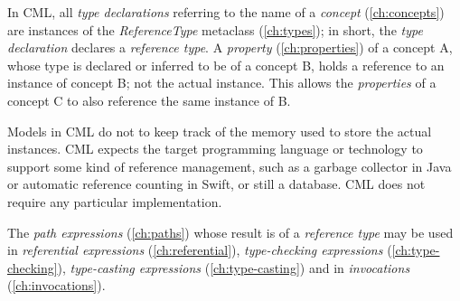 In CML, all \emph{type declarations}
referring to the name of a \emph{concept} (\ref{ch:concepts})
are instances of the \emph{ReferenceType} metaclass (\ref{ch:types});
in short, the \emph{type declaration} declares a \emph{reference type}.
A \emph{property} (\ref{ch:properties}) of a concept A,
whose type is declared or inferred to be of a concept B,
holds a reference to an instance of concept B; not the actual instance.
This allows the \emph{properties} of a concept C
to also reference the same instance of B.

Models in CML do not to keep track of the memory used
to store the actual instances.
CML expects the target programming language or technology
to support some kind of reference management,
such as a garbage collector in Java or automatic reference counting in Swift,
or still a database.
CML does not require any particular implementation.

The \emph{path expressions} (\ref{ch:paths})
whose result is of a \emph{reference type} may be used
in \emph{referential expressions} (\ref{ch:referential}),
\emph{type-checking expressions} (\ref{ch:type-checking}),
\emph{type-casting expressions} (\ref{ch:type-casting})
and in \emph{invocations} (\ref{ch:invocations}).
